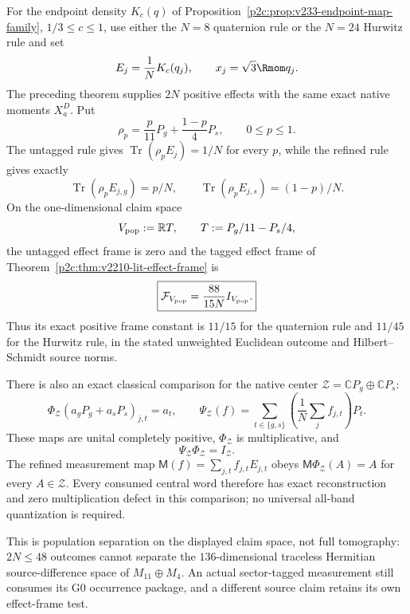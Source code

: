 \documentclass[12pt,a4paper]{article}
\begin{document}
\begin{corollary}
\label{p2c:cor:v2211-tagged-intrinsic-populations}
For the endpoint density $K_c(q)$ of
Proposition~\ref{p2c:prop:v233-endpoint-map-family}, $1/3\le c\le1$,
use either the $N=8$ quaternion rule or the $N=24$ Hurwitz rule and set
\[
 E_j=\frac1N K_c(q_j),\qquad x_j=\sqrt3\Rmom q_j.
\]
The preceding theorem supplies $2N$ positive effects with the same exact
native moments $X_a^D$.  Put
\[
 \rho_p=\frac p{11}P_g+\frac{1-p}{4}P_s,\qquad0\le p\le1.
\]
The untagged rule gives $\operatorname{Tr}(\rho_pE_j)=1/N$ for every
$p$, while the refined rule gives exactly
\[
 \boxed{\operatorname{Tr}(\rho_pE_{j,g})=p/N,\qquad
        \operatorname{Tr}(\rho_pE_{j,s})=(1-p)/N.}
\]
On the one-dimensional claim space
\[
 V_{\rm pop}:=\mathbb R T,\qquad
 T:=P_g/11-P_s/4,
\]
the untagged effect frame is zero and the tagged effect frame of
Theorem~\ref{p2c:thm:v2210-lit-effect-frame} is
\[
 \boxed{\mathcal F_{V_{\rm pop}}
       =\frac{88}{15N}I_{V_{\rm pop}}.}
\]
Thus its exact positive frame constant is $11/15$ for the quaternion
rule and $11/45$ for the Hurwitz rule, in the stated unweighted Euclidean
outcome and Hilbert--Schmidt source norms.

There is also an exact classical comparison for the native center
$\mathcal Z=\mathbb CP_g\oplus\mathbb CP_s$:
\[
 \Phi_{\mathcal Z}(a_gP_g+a_sP_s)_{j,t}=a_t,\qquad
 \Psi_{\mathcal Z}(f)
       =\sum_{t\in\{g,s\}}\left(\frac1N\sum_j f_{j,t}\right)P_t.
\]
These maps are unital completely positive, $\Phi_{\mathcal Z}$ is
multiplicative, and
\[
 \boxed{\Psi_{\mathcal Z}\Phi_{\mathcal Z}=I_{\mathcal Z}.}
\]
The refined measurement map
$\mathsf M(f)=\sum_{j,t}f_{j,t}E_{j,t}$ obeys
$\mathsf M\Phi_{\mathcal Z}(A)=A$ for every $A\in\mathcal Z$.
Every consumed central word therefore has exact reconstruction and zero
multiplication defect in this comparison; no universal all-band
quantization is required.

This is population separation on the displayed claim space, not full
tomography: $2N\le48$ outcomes cannot separate the $136$-dimensional
traceless Hermitian source-difference space of $M_{11}\oplus M_4$.
An actual sector-tagged measurement still consumes its G0 occurrence
package, and a different source claim retains its own effect-frame test.
\end{corollary}
\end{document}
